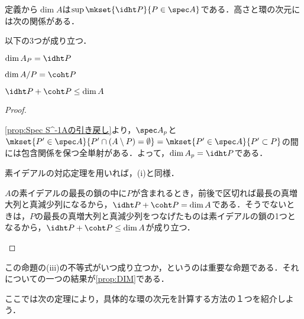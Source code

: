 定義から$\dim A$は$\sup\mkset{\idht P}{P\in\spec A}$である．高さと環の次元には次の関係がある．
	
\begin{prop}\label{prop:htとcohtの定義}
	以下の3つが成り立つ．
	\begin{sakura}
		\item $\dim A_P=\idht P$
		\item $\dim A/P=\coht P$
		\item $\idht P+\coht P\leq\dim A$
	\end{sakura}
\end{prop}

\begin{proof}
	\begin{sakura}
		\item 
			\ref{prop:Spec S^-1Aの引き戻し}より，$\spec A_p$と$\mkset{ P '\in\spec A}{ P '\cap (A\setminus P )=\emptyset}=\mkset{ P '\in\spec A}{ P '\subset P }$の間には包含関係を保つ全単射がある．よって，$\dim A_p=\idht P $である．
		\item 
			素イデアルの対応定理を用いれば，(i)と同様．
		\item 
			$A$の素イデアルの最長の鎖の中に$ P $が含まれるとき，前後で区切れば最長の真増大列と真減少列になるから，$\idht P +\coht P =\dim A$である．そうでないときは，$ P $の最長の真増大列と真減少列をつなげたものは素イデアルの鎖の1つとなるから，$\idht P +\coht P \leq\dim A$が成り立つ．
	\end{sakura}
\end{proof}
	
この命題の(iii)の不等式がいつ成り立つか，というのは重要な命題である．それについての一つの結果が\ref{prop:DIM}である．

ここでは次の定理により，具体的な環の次元を計算する方法の１つを紹介しよう．

